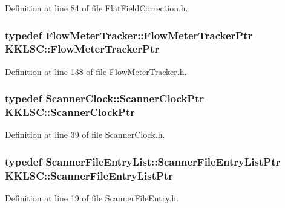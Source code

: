 Definition at line 84 of file Flat\+Field\+Correction.\+h.

\subsubsection[{\texorpdfstring{Flow\+Meter\+Tracker\+Ptr}{FlowMeterTrackerPtr}}]{\setlength{\rightskip}{0pt plus 5cm}typedef {\bf Flow\+Meter\+Tracker\+::\+Flow\+Meter\+Tracker\+Ptr} {\bf K\+K\+L\+S\+C\+::\+Flow\+Meter\+Tracker\+Ptr}}\hypertarget{namespace_k_k_l_s_c_afcd320057dff4ae7ce3fac260af044b9}{}\label{namespace_k_k_l_s_c_afcd320057dff4ae7ce3fac260af044b9}


Definition at line 138 of file Flow\+Meter\+Tracker.\+h.

\subsubsection[{\texorpdfstring{Scanner\+Clock\+Ptr}{ScannerClockPtr}}]{\setlength{\rightskip}{0pt plus 5cm}typedef {\bf Scanner\+Clock\+::\+Scanner\+Clock\+Ptr} {\bf K\+K\+L\+S\+C\+::\+Scanner\+Clock\+Ptr}}\hypertarget{namespace_k_k_l_s_c_ac5802f7c76843b22e86cabe21b6500e5}{}\label{namespace_k_k_l_s_c_ac5802f7c76843b22e86cabe21b6500e5}


Definition at line 39 of file Scanner\+Clock.\+h.

\subsubsection[{\texorpdfstring{Scanner\+File\+Entry\+List\+Ptr}{ScannerFileEntryListPtr}}]{\setlength{\rightskip}{0pt plus 5cm}typedef {\bf Scanner\+File\+Entry\+List\+::\+Scanner\+File\+Entry\+List\+Ptr} {\bf K\+K\+L\+S\+C\+::\+Scanner\+File\+Entry\+List\+Ptr}}\hypertarget{namespace_k_k_l_s_c_ab51c44a94fde307d25c3f0cc93c6bf64}{}\label{namespace_k_k_l_s_c_ab51c44a94fde307d25c3f0cc93c6bf64}


Definition at line 19 of file Scanner\+File\+Entry.\+h.

